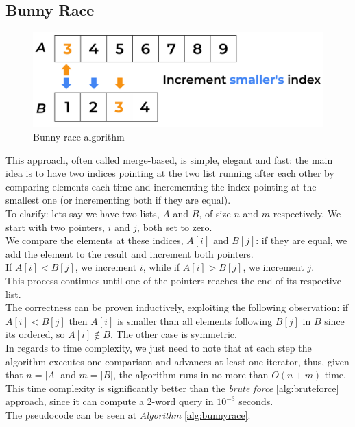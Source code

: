 \subsection{Bunny Race \label{sec:bunnyrace}}

\begin{figure}[H] 
    \begin{center}
        \includegraphics[width=.8\textwidth]{imgs/bunny_search.png}
        \caption{Bunny race algorithm \label{fig:bunnyrace}}
    \end{center}
\end{figure}

This approach, often called merge-based, is simple, elegant and fast: the main idea is to have two indices pointing at the two list running after each other by comparing elements each time and incrementing the index pointing at the smallest one (or incrementing both if they are equal).\\ 
To clarify: lets say we have two lists, $A$ and $B$, of size $n$ and $m$ respectively. We start with two pointers, $i$ and $j$, both set to zero. \\
We compare the elements at these indices, $A[i]$ and $B[j]$: if they are equal, we add the element to the result and increment both pointers. \\
If $A[i] < B[j]$, we increment $i$, while if $A[i] > B[j]$, we increment $j$. \\
This process continues until one of the pointers reaches the end of its respective list.\\
The correctness can be proven inductively, exploiting the following observation: if $A[i] < B[j]$ then $A[i]$ is smaller than all elements following $B[j]$ in $B$ since its ordered, so $A[i] \notin B$. The other case is symmetric. \\
In regards to time complexity, we just need to note that at each step the algorithm executes one comparison and advances at least one iterator, thus, given that $n=|A|$ and $m=|B|$, the algorithm runs in no more than $O(n+m)$ time.\\
This time complexity is significantly better than the \textit{brute force} \ref{alg:bruteforce} approach, since it can compute a 2-word query in $10^{-3}$ seconds. \\
The pseudocode can be seen at \textit{Algorithm} \ref{alg:bunnyrace}.

